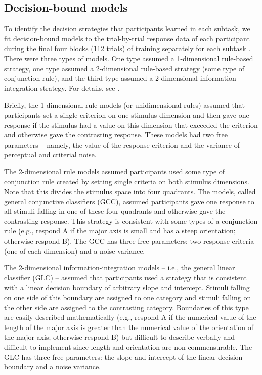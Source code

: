 \documentclass[doc, floatsintext]{apa7}
\begin{document}
\subsection{Decision-bound models}
To identify the decision strategies that participants
learned in each subtask, we fit decision-bound models to the
trial-by-trial response data of each participant during the
final four blocks (112 trials) of training separately for
each subtask \parencite{maddox_comparing_1993,
ashby_decision_1988}. There were three types of models. One
type assumed a 1-dimensional rule-based strategy, one type
assumed a 2-dimensional rule-based strategy (some type of
conjunction rule), and the third type assumed a
2-dimensional information-integration strategy. For details,
see \textcite{ashby_multiple_2017}.

Briefly, the 1-dimensional rule models (or unidimensional
rules) assumed that participants set a single criterion on
one stimulus dimension and then gave one response if the
stimulus had a value on this dimension that exceeded the
criterion and otherwise gave the contrasting response. These
models had two free parameters -- namely, the value of the
response criterion and the variance of perceptual and
criterial noise.

The 2-dimensional rule models assumed participants used some
type of conjunction rule created by setting single criteria
on both stimulus dimensions. Note that this divides the
stimulus space into four quadrants. The models, called
general conjunctive classifiers (GCC), assumed participants
gave one response to all stimuli falling in one of these
four quadrants and otherwise gave the contrasting response.
This strategy is consistent with some types of a conjunction
rule (e.g., respond A if the major axis is small and has a
steep orientation; otherwise respond B). The GCC has three
free parameters: two response criteria (one of each
dimension) and a noise variance.

The 2-dimensional information-integration models -- i.e.,
the general linear classifier (GLC) -- assumed that
participants used a strategy that is consistent with a
linear decision boundary of arbitrary slope and intercept.
Stimuli falling on one side of this boundary are assigned to
one category and stimuli falling on the other side are
assigned to the contrasting category. Boundaries of this
type are easily described mathematically (e.g., respond A if
the numerical value of the length of the major axis is
greater than the numerical value of the orientation of the
major axis; otherwise respond B) but difficult to describe
verbally and difficult to implement since length and
orientation are non-commensurable. The GLC has three free
parameters: the slope and intercept of the linear decision
boundary and a noise variance.
\end{document}
